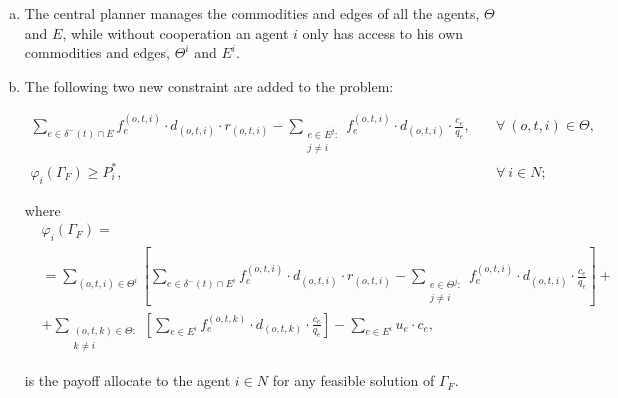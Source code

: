 \documentclass[review]{elsarticle}
\begin{document}
\begin{enumerate}[(a)]
	\item The central planner manages the commodities and edges of
all the agents, $\Theta$ and $E$, while without cooperation an agent $i$ only has access to his own commodities and edges, $\Theta^i$ and $E^i$.
	\item The following two new constraint are added to the problem:

\begin{align}
\sum_{e \in \delta^-(t)\cap E}  f_e^{(o,t,i)} \cdot d_{(o,t,i)} \cdot r_{(o,t,i)} - \sum_{\substack{e \in E^j\colon \\ j\not = i}} f_e^{(o,t,i)} \cdot d_{(o,t,i)} \cdot \frac{c_e}{q_e}, \quad & \forall\ (o,t,i) \in \Theta, \label{eq:commodirevenue}\\
\varphi_i(\Gamma_F) \geq P_i^*,\quad & \forall\ i\in N; \label{eq:newconstraintFullCooperation}
\end{align}

where
\begin{equation}
    \begin{split}
    & \varphi_i(\Gamma_F) =\label{eq:FullCooperationPayoff} \\
    & = \sum_{(o,t,i)\in \Theta^i} \left[ \sum_{e \in \delta^-(t)\cap E^i} f_e^{(o,t,i)} \cdot d_{(o,t,i)} \cdot r_{(o,t,i)} -  \sum_{\substack{e\in \Theta^j \colon\\ j\not = i}} f_e^{(o,t,i)} \cdot d_{(o,t,i)} \cdot \frac{c_e}{q_e} \right] + \\
    & + \sum_{\substack{(o,t,k) \in \Theta  \colon \\ k \not = i}} \left[\sum_{e \in E^i} f_e^{(o,t,k)} \cdot d_{(o,t,k)} \cdot \frac{c_e}{q_e}\right] - \sum_{e \in E^i} u_e \cdot c_e, 
    \end{split}
\end{equation}

is the payoff allocate to the agent $i\in N$ for any feasible solution
of $\Gamma_F$.


\end{enumerate}
\end{document}
